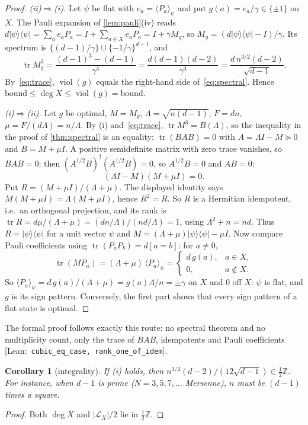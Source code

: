 \documentclass[a4paper,onecolumn,11pt,unpublished,nopdfoutputerror]{quantumarticle}
\newtheorem{corollary}[theorem]{Corollary}
\theoremstyle{definition}
\newcommand{\leanin}[1]{{\footnotesize\color{leangreen}[\textsf{Lean}:~\texttt{#1}]}}
\newcommand{\Z}{\mathbb{Z}}
\renewcommand{\deg}{\operatorname{deg}}
\newcommand{\Lines}{\mathcal{L}}
\newcommand{\tr}{\operatorname{tr}}
\newcommand{\viol}{\operatorname{viol}}
\newcommand{\ev}[1]{\langle #1\rangle}
\newcommand{\proj}[1]{\lvert #1\rangle\langle #1\rvert}
\begin{document}
\begin{proof}
\emph{(ii)$\Rightarrow$(i).} Let $\psi$ be flat with $e_a=\ev{P_a}_\psi$ and put $g(a)=e_a/\gamma\in\{\pm1\}$ on $X$.
The Pauli expansion of \cref{lem:pauli}(iv) reads
$d\proj\psi=\sum_ae_aP_a=I+\sum_{a\in X}e_aP_a=I+\gamma M_g$, so $M_g=(d\proj\psi-I)/\gamma$. Its spectrum is
$\{(d-1)/\gamma\}\cup\{-1/\gamma\}^{d-1}$, and
\[
  \tr M_g^3=\frac{(d-1)^3-(d-1)}{\gamma^3}=\frac{d(d-1)(d-2)}{\gamma^3}=\frac{d\,n^{3/2}(d-2)}{\sqrt{d-1}} .
\]
By~\eqref{eq:trace}, $\viol(g)$ equals the right-hand side of~\eqref{eq:spectral}. Hence
$\text{bound}\le\deg X\le\viol(g)=\text{bound}$.

\emph{(i)$\Rightarrow$(ii).} Let $g$ be optimal, $M=M_g$, $\Lambda=\sqrt{n(d-1)}$, $F=dn$, $\mu=F/(d\Lambda)=n/\Lambda$.
By (i) and~\eqref{eq:trace}, $\tr M^3=B(\Lambda)$, so the inequality in the proof of \cref{thm:spectral} is an
equality: $\tr(BAB)=0$ with $A=\Lambda I-M\succeq0$ and $B=M+\mu I$. A positive semidefinite matrix with zero
trace vanishes, so $BAB=0$; then $(A^{1/2}B)^\dagger(A^{1/2}B)=0$, so $A^{1/2}B=0$ and $AB=0$:
\[
  (\Lambda I-M)(M+\mu I)=0 .
\]
Put $R=(M+\mu I)/(\Lambda+\mu)$. The displayed identity says $M(M+\mu I)=\Lambda(M+\mu I)$, hence $R^2=R$. So $R$
is a Hermitian idempotent, i.e.\ an orthogonal projection, and its rank is
$\tr R=d\mu/(\Lambda+\mu)=(dn/\Lambda)\big/(nd/\Lambda)=1$, using $\Lambda^2+n=nd$. Thus $R=\proj\psi$ for a unit
vector $\psi$ and $M=(\Lambda+\mu)\proj\psi-\mu I$. Now compare Pauli coefficients using
$\tr(P_aP_b)=d[a=b]$: for $a\ne0$,
\[
  \tr(MP_a)=(\Lambda+\mu)\,\ev{P_a}_\psi=\begin{cases}d\,g(a),&a\in X,\\0,&a\notin X.\end{cases}
\]
So $\ev{P_a}_\psi=d\,g(a)/(\Lambda+\mu)=g(a)\Lambda/n=\pm\gamma$ on $X$ and $0$ off $X$: $\psi$ is flat, and $g$ is
its sign pattern. Conversely, the first part shows that every sign pattern of a flat state is optimal.
\end{proof}

The formal proof follows exactly this route: no spectral theorem and no multiplicity count, only the trace of
$BAB$, idempotents and Pauli coefficients \leanin{cubic\_eq\_case, rank\_one\_of\_idem}.

\begin{corollary}[integrality]\label{cor:integrality}
If (i) holds, then $n^{3/2}(d-2)/(12\sqrt{d-1})\in\tfrac12\Z$. For instance, when $d-1$ is prime ($N=3,5,7,\dots$
Mersenne), $n$ must be $(d-1)$ times a square.
\end{corollary}
\begin{proof}
Both $\deg X$ and $|\Lines_X|/2$ lie in $\tfrac12\Z$.
\end{proof}
\end{document}
